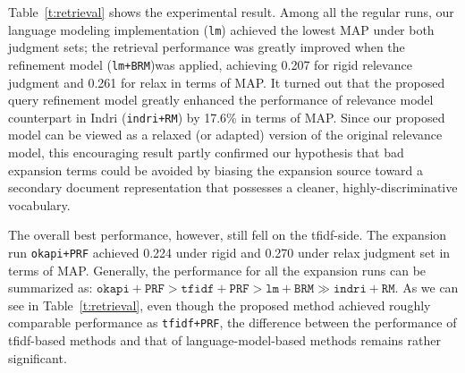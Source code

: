 Table~\ref{t:retrieval} shows the experimental result.  Among all the regular
runs, our language modeling implementation ({\tt lm}) achieved the lowest MAP
under both judgment sets; the retrieval performance was greatly improved when
the refinement model ({\tt lm+BRM})was applied, achieving 0.207 for rigid
relevance judgment and 0.261 for relax in terms of MAP.  It turned out that the
proposed query refinement model greatly enhanced the performance of relevance
model counterpart in Indri ({\tt indri+RM}) by 17.6\% in terms of MAP.  Since
our proposed model can be viewed as a relaxed (or adapted) version of the
original relevance model, this encouraging result partly confirmed our
hypothesis that bad expansion terms could be avoided by biasing the expansion
source toward a secondary document representation that possesses a cleaner,
highly-discriminative vocabulary.  

The overall best performance, however, still fell on the tfidf-side.  The
expansion run {\tt okapi+PRF} achieved 0.224 under rigid and 0.270 under relax
judgment set in terms of MAP.  Generally, the performance for all the expansion
runs can be summarized as: $\mathtt{okapi+PRF} > \mathtt{tfidf+PRF} >
\mathtt{lm+BRM} \gg \mathtt{indri+RM}$.  As we can see in
Table~\ref{t:retrieval}, even though the proposed method achieved roughly
comparable performance as {\tt tfidf+PRF}, the difference between the
performance of tfidf-based methods and that of language-model-based methods
remains rather significant.  


